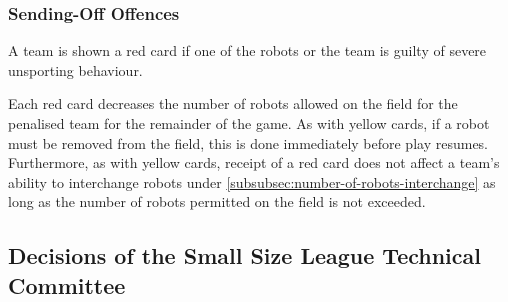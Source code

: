 \subsubsection{Sending-Off Offences}
A team is shown a red card if one of the robots or the team is guilty of severe unsporting behaviour.

Each red card decreases the number of robots allowed on the field for the penalised team for the remainder of the game.
As with yellow cards, if a robot must be removed from the field, this is done immediately before play resumes.
Furthermore, as with yellow cards, receipt of a red card does not affect a team's ability to interchange robots under \autoref{subsubsec:number-of-robots-interchange} as long as the number of robots permitted on the field is not exceeded.

\subsection*{Decisions of the Small Size League Technical Committee}
